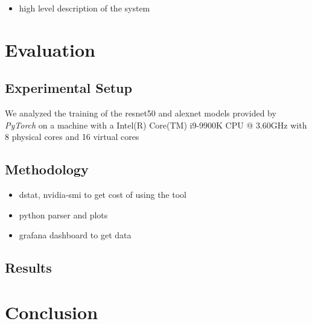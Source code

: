 \documentclass[conference]{IEEEtran}
\begin{document}
\begin{itemize}
    \item high level description of the system
\end{itemize}

\section{Evaluation}
\subsection{Experimental Setup}

We analyzed the training of the resnet50 \cite{resnet50} and alexnet \cite{alexnet} models
provided by \textit{PyTorch} on a machine with a Intel(R) Core(TM) i9-9900K CPU @ 3.60GHz with
8 physical cores and 16 virtual cores


\subsection{Methodology}

\begin{itemize}
    \item dstat, nvidia-smi to get cost of using the tool
    \item python parser and plots
    \item grafana dashboard to get data 
\end{itemize}

\subsection{Results}

\section{Conclusion}


\end{document}
